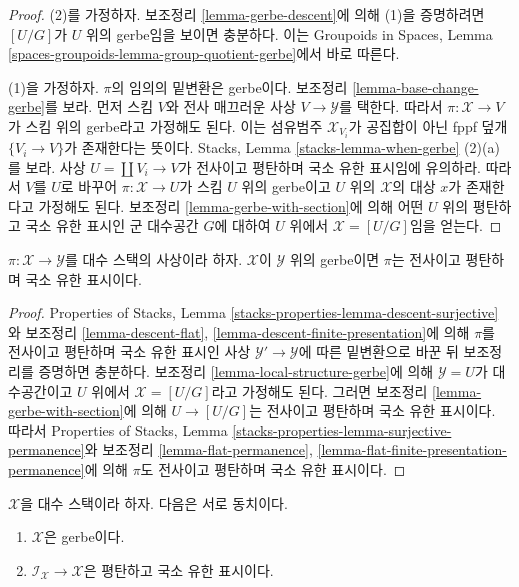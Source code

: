 \begin{proof}
(2)를 가정하자. 보조정리 \ref{lemma-gerbe-descent}에 의해 (1)을
증명하려면 $[U/G]$가 $U$ 위의 gerbe임을 보이면 충분하다. 이는
Groupoids in Spaces, Lemma
\ref{spaces-groupoids-lemma-group-quotient-gerbe}에서 바로 따른다.

\medskip\noindent
(1)을 가정하자. $\pi$의 임의의 밑변환은 gerbe이다. 보조정리
\ref{lemma-base-change-gerbe}를 보라. 먼저 스킴 $V$와 전사 매끄러운 사상
$V \to \mathcal{Y}$를 택한다. 따라서 $\pi : \mathcal{X} \to V$가 스킴
위의 gerbe라고 가정해도 된다. 이는 섬유범주 $\mathcal{X}_{V_i}$가
공집합이 아닌 fppf 덮개 $\{V_i \to V\}$가 존재한다는 뜻이다. Stacks,
Lemma \ref{stacks-lemma-when-gerbe} (2)(a)를 보라. 사상
$U = \coprod V_i \to V$가 전사이고 평탄하며 국소 유한 표시임에
유의하라. 따라서 $V$를 $U$로 바꾸어 $\pi : \mathcal{X} \to U$가 스킴
$U$ 위의 gerbe이고 $U$ 위의 $\mathcal{X}$의 대상 $x$가 존재한다고
가정해도 된다. 보조정리 \ref{lemma-gerbe-with-section}에 의해 어떤
$U$ 위의 평탄하고 국소 유한 표시인 군 대수공간 $G$에 대하여
$U$ 위에서 $\mathcal{X} = [U/G]$임을 얻는다.
\end{proof}

\begin{lemma}
\label{lemma-gerbe-fppf}
$\pi : \mathcal{X} \to \mathcal{Y}$를 대수 스택의 사상이라 하자.
$\mathcal{X}$이 $\mathcal{Y}$ 위의 gerbe이면 $\pi$는 전사이고 평탄하며
국소 유한 표시이다.
\end{lemma}

\begin{proof}
Properties of Stacks, Lemma
\ref{stacks-properties-lemma-descent-surjective}
와 보조정리 \ref{lemma-descent-flat},
\ref{lemma-descent-finite-presentation}에 의해 $\pi$를 전사이고 평탄하며
국소 유한 표시인 사상 $\mathcal{Y}' \to \mathcal{Y}$에 따른 밑변환으로
바꾼 뒤 보조정리를 증명하면 충분하다.%
보조정리 \ref{lemma-local-structure-gerbe}에 의해 $\mathcal{Y} = U$가
대수공간이고 $U$ 위에서 $\mathcal{X} = [U/G]$라고 가정해도 된다.
그러면 보조정리 \ref{lemma-gerbe-with-section}에 의해
$U \to [U/G]$는 전사이고 평탄하며 국소 유한 표시이다. 따라서
Properties of Stacks, Lemma
\ref{stacks-properties-lemma-surjective-permanence}와 보조정리
\ref{lemma-flat-permanence},
\ref{lemma-flat-finite-presentation-permanence}에 의해 $\pi$도 전사이고
평탄하며 국소 유한 표시이다.
\end{proof}

\begin{proposition}
\label{proposition-when-gerbe}
$\mathcal{X}$을 대수 스택이라 하자. 다음은 서로 동치이다.
\begin{enumerate}
\item $\mathcal{X}$은 gerbe이다.
\item $\mathcal{I}_\mathcal{X} \to \mathcal{X}$은 평탄하고 국소 유한
표시이다.
\end{enumerate}
\end{proposition}

